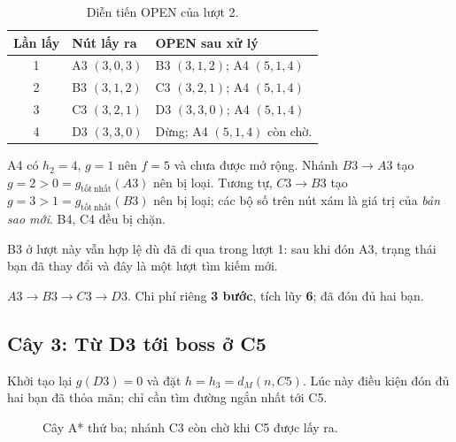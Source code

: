 \begin{table}[ht!]
    \centering
    \caption{Diễn tiến OPEN của lượt 2.}
    \small
    \renewcommand{\arraystretch}{1.3}
    \begin{tabularx}{\textwidth}{c l X}
        \toprule
        \textbf{Lần lấy} & \textbf{Nút lấy ra} & \textbf{OPEN sau xử lý} \\
        \midrule
        1 & A3 $(3,0,3)$ & B3 $(3,1,2)$; A4 $(5,1,4)$ \\
        2 & B3 $(3,1,2)$ & C3 $(3,2,1)$; A4 $(5,1,4)$ \\
        3 & C3 $(3,2,1)$ & D3 $(3,3,0)$; A4 $(5,1,4)$ \\
        4 & D3 $(3,3,0)$ & Dừng; A4 $(5,1,4)$ còn chờ. \\
        \bottomrule
    \end{tabularx}
\end{table}

A4 có $h_2=4$, $g=1$ nên $f=5$ và chưa được mở rộng. Nhánh $B3\to A3$ tạo $g=2>0=g_{\mathrm{tốt\ nhất}}(A3)$ nên bị loại. Tương tự, $C3\to B3$ tạo $g=3>1=g_{\mathrm{tốt\ nhất}}(B3)$ nên bị loại; các bộ số trên nút xám là giá trị của \emph{bản sao mới}. B4, C4 đều bị chặn.

B3 ở lượt này vẫn hợp lệ dù đã đi qua trong lượt 1: sau khi đón A3, trạng thái bạn đã thay đổi và đây là một lượt tìm kiếm mới.

\begin{calloutnote}
    $A3\to B3\to C3\to D3$. Chi phí riêng \textbf{3 bước}, tích lũy \textbf{6}; đã đón đủ hai bạn.
\end{calloutnote}

\clearpage
\subsection{Cây 3: Từ D3 tới boss ở C5}

Khởi tạo lại $g(D3)=0$ và đặt $h=h_3=d_M(n,C5)$. Lúc này điều kiện đón đủ hai bạn đã thỏa mãn; chỉ cần tìm đường ngắn nhất tới C5.

\begin{figure}[ht!]
    \centering
    \caption{Cây A* thứ ba; nhánh C3 còn chờ khi C5 được lấy ra.}
\end{figure}

